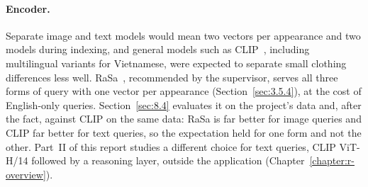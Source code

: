 \paragraph{Encoder.} Separate image and text models would mean two vectors per appearance and two models during indexing, and general models such as CLIP~\cite{radford2021clip}, including multilingual variants for Vietnamese, were expected to separate small clothing differences less well. RaSa~\cite{bai2023rasa}, recommended by the supervisor, serves all three forms of query with one vector per appearance (Section~\ref{sec:3.5.4}), at the cost of English-only queries. Section~\ref{sec:8.4} evaluates it on the project's data and, after the fact, against CLIP on the same data: RaSa is far better for image queries and CLIP far better for text queries, so the expectation held for one form and not the other. Part~II of this report studies a different choice for text queries, CLIP ViT-H/14 followed by a reasoning layer, outside the application (Chapter~\ref{chapter:r-overview}).
